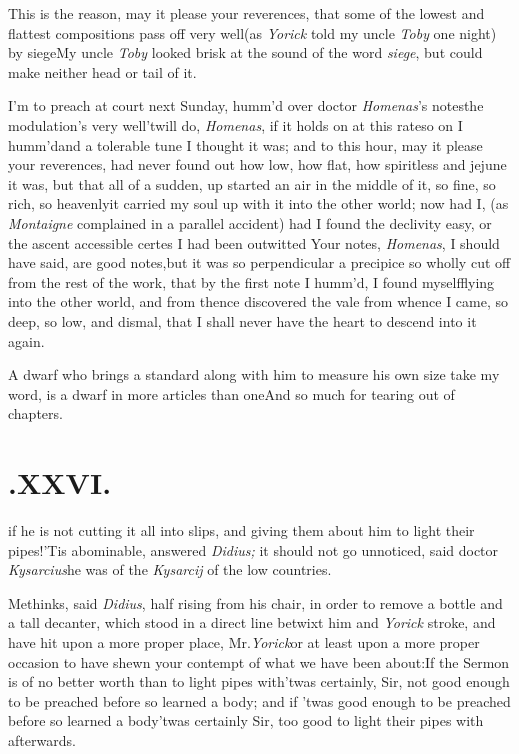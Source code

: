 \documentclass[twoside]{article}
\begin{document}
\tsk This is the reason, may it please your reverences, that
some of the lowest and flattest compositions pass off
very\break
well\tsk (as \textit{Yorick} told my uncle \textit{Toby} one
night) by siege\tsk My uncle \textit{Toby} looked brisk at
the sound of the word \textit{siege}, but could make neither head or tail of
it.

I’m to preach at court next Sunday, 
humm’d over doctor \textit{Homenas}’s notes\tsk the
modulation’s very well\tsk ’twill do,
\textit{Homenas}, if it holds on at this rate\tsk so on I
humm’d\tsk and a tolerable tune I thought it was; and to
this hour, may it please your reverences, had never found
out how low, how flat, how spiritless and jejune it was, but
that all of a sudden, up started an air in the middle of it,
so fine, so rich, so heavenly\tsk it carried my soul up
with it into the other world; now had I, (as
\textit{Montaigne} complained in a parallel accident)\tsk
had I found the declivity easy, or the ascent accessible\tsk
certes I had been outwitted\break
\tsk Your notes, \textit{Homenas}, I should have said, are
good notes,\tsk but it was so per\-pendicular a precipice\tsk
so wholly cut off from the rest of the work, that by
the\break
first note I humm’d, I found myself\break flying into the other
world, and from thence discovered the vale from whence\break
I came, so deep, so low, and dismal,
that I shall never have
the heart to descend into it again.

\noindent
\fist A dwarf who brings a standard\break
along with him to measure his own size\break
\tsk take my word, is a dwarf in more articles than
one\tsk And so much for tearing out of chapters.

\bigskip

\section{.\enspace XXVI.}

if he is not cutting it all into slips, and giving them
about him to light their pipes!\tsh ’Tis abominable,
answered \textit{Didius;} it should not go unnoticed, said
doctor \textit{Kysarcius}\tsh \fist  he was of the
\textit{Kysarcij} of the low countries.

Methinks, said \textit{Didius}, half rising\break
from his chair, in order to remove a
bottle and a tall decanter, which stood in a direct line
betwixt him and \textit{Yorick}\break
{}
stroke, and have hit upon a more proper
place, Mr.\@ \textit{Yorick}\tsk or at least upon a more
proper occasion to have shewn your contempt of what we have
been about:\break If the Sermon is of no better worth than to
light pipes with\tsk ’twas certainly, Sir, not good enough
to be preached before so learned a body; and if ’twas good
enough to be preached before so learned a body\tsk ’twas
certainly Sir, too good to light their pipes with
afterwards.
\end{document}
